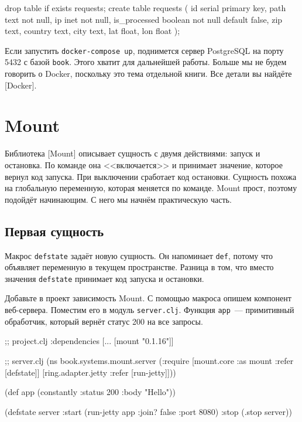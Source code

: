 \else

\begin{english}
  \begin{sql}
drop table if exists requests;
create table requests (
    id            serial primary key,
    path          text not null,
    ip            inet not null,
    is_processed  boolean not null default false,
    zip           text,
    country       text,
    city          text,
    lat           float,
    lon           float
);
  \end{sql}
\end{english}

\fi

Если запустить \verb|docker-compose up|, поднимется сервер Postgre\-SQL на порту
5432 с базой \verb|book|. Этого хватит для дальнейшей работы. Больше мы не
будем говорить о Docker, поскольку это тема отдельной книги. Все детали вы
найдёте [Docker].

\section{Mount}


Библиотека [Mount]
описывает сущность с двумя действиями: запуск и остановка. По команде она
<<включается>> и принимает значение, которое вернул код запуска. При выключении
сработает код остановки. Сущность похожа на глобальную переменную, которая
меняется по команде. Mount прост, поэтому подойдёт начинающим. С него мы начнём
практическую часть.

\subsection{Первая сущность}


Макрос \verb|defstate| задаёт новую сущность. Он напоминает \verb|def|,
потому что объявляет переменную в текущем пространстве. Разница в том, что
вместо значения \verb|defstate| принимает код запуска и остановки.

Добавьте в проект зависимость Mount. С помощью макроса опишем компонент
веб-сервера. Поместим его в модуль \verb|server.clj|. Функция \verb|app|~---
примитивный обработчик, который вернёт статус 200 на все запросы.

\ifnarrow

\begin{english}
  \begin{clojure}
;; project.clj
:dependencies [... [mount "0.1.16"]]

;; server.clj
(ns book.systems.mount.server
  (:require
   [mount.core :as mount
    :refer [defstate]]
   [ring.adapter.jetty
    :refer [run-jetty]]))

(def app (constantly
           {:status 200 :body "Hello"}))

(defstate server
  :start (run-jetty app
           {:join? false :port 8080})
  :stop (.stop server))
  \end{clojure}
\end{english}

